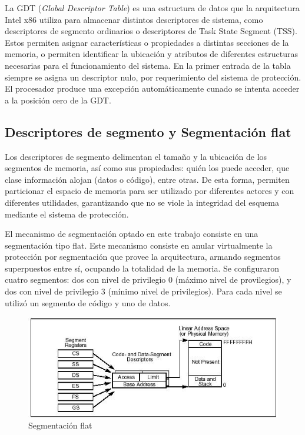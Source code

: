 	La GDT (\textit{Global Descriptor Table}) es una estructura de datos
que la arquitectura Intel x86 utiliza para almacenar distintos descriptores
de sistema, como descriptores de segmento ordinarios o descriptores de Task State 
Segment (TSS). Estos permiten asignar características o propiedades a distintas secciones de la memoria, 
o permiten identificar la ubicación y atributos de diferentes estructuras necesarias para el funcionamiento 
del sistema.
	En la primer entrada de la tabla siempre se asigna un descriptor nulo, por requerimiento del 
sistema de protección. El procesador produce una excepción automáticamente cunado se intenta acceder a la posición cero de la GDT.

\subsection{Descriptores de segmento y Segmentación flat}

	Los descriptores de segmento delimentan el tamaño y la ubicación de los segmentos de memoria, así como 
sus propiedades: quién los puede acceder, que clase información alojan (datos o código), entre otras. De esta forma, permiten particionar el espacio de memoria para ser utilizado por diferentes actores y con diferentes utilidades, garantizando que no se viole la integridad del esquema mediante el sistema de protección.

	El mecanismo de segmentación optado en este trabajo consiste en una segmentación tipo flat.
Este mecanismo consiste en anular virtualmente la protección por segmentación que provee la arquitectura, armando segmentos superpuestos entre sí, ocupando la totalidad de la memoria. Se configuraron cuatro segmentos: dos con nivel de privilegio 0 (máximo nivel de provilegios), y dos con nivel de privilegio
3 (mínimo nivel de privilegios). Para cada nivel se utilizó un segmento de código y uno
de datos.

\begin{figure}[h]
\begin{center}
  \includegraphics[scale=3.0]{secciones/dibujitos/modelo_flat.jpg}
\end{center}
\caption{Segmentación flat}
\end{figure}

